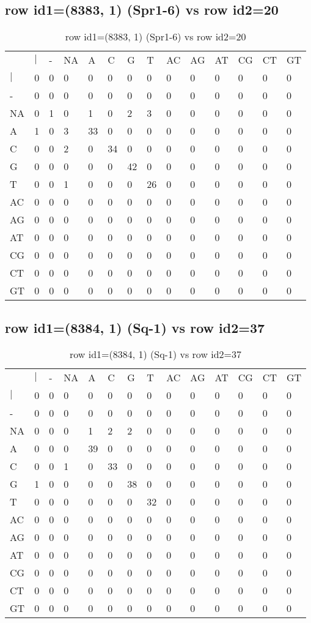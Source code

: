 \subsection{row id1=(8383, 1) (Spr1-6) vs row id2=20}
\begin{center}
\begin{longtable}{|l|l|l|l|l|l|l|l|l|l|l|l|l|l|}
\caption{row id1=(8383, 1) (Spr1-6) vs row id2=20} \label{table_dm622}\\
\hline
\\
\hline
&$|$&-&NA&A&C&G&T&AC&AG&AT&CG&CT&GT\\
$|$&0&0&0&0&0&0&0&0&0&0&0&0&0\\
-&0&0&0&0&0&0&0&0&0&0&0&0&0\\
NA&0&1&0&1&0&2&3&0&0&0&0&0&0\\
A&1&0&3&33&0&0&0&0&0&0&0&0&0\\
C&0&0&2&0&34&0&0&0&0&0&0&0&0\\
G&0&0&0&0&0&42&0&0&0&0&0&0&0\\
T&0&0&1&0&0&0&26&0&0&0&0&0&0\\
AC&0&0&0&0&0&0&0&0&0&0&0&0&0\\
AG&0&0&0&0&0&0&0&0&0&0&0&0&0\\
AT&0&0&0&0&0&0&0&0&0&0&0&0&0\\
CG&0&0&0&0&0&0&0&0&0&0&0&0&0\\
CT&0&0&0&0&0&0&0&0&0&0&0&0&0\\
GT&0&0&0&0&0&0&0&0&0&0&0&0&0\\
\hline
\end{longtable}
\end{center}

\subsection{row id1=(8384, 1) (Sq-1) vs row id2=37}
\begin{center}
\begin{longtable}{|l|l|l|l|l|l|l|l|l|l|l|l|l|l|}
\caption{row id1=(8384, 1) (Sq-1) vs row id2=37} \label{table_dm624}\\
\hline
\\
\hline
&$|$&-&NA&A&C&G&T&AC&AG&AT&CG&CT&GT\\
$|$&0&0&0&0&0&0&0&0&0&0&0&0&0\\
-&0&0&0&0&0&0&0&0&0&0&0&0&0\\
NA&0&0&0&1&2&2&0&0&0&0&0&0&0\\
A&0&0&0&39&0&0&0&0&0&0&0&0&0\\
C&0&0&1&0&33&0&0&0&0&0&0&0&0\\
G&1&0&0&0&0&38&0&0&0&0&0&0&0\\
T&0&0&0&0&0&0&32&0&0&0&0&0&0\\
AC&0&0&0&0&0&0&0&0&0&0&0&0&0\\
AG&0&0&0&0&0&0&0&0&0&0&0&0&0\\
AT&0&0&0&0&0&0&0&0&0&0&0&0&0\\
CG&0&0&0&0&0&0&0&0&0&0&0&0&0\\
CT&0&0&0&0&0&0&0&0&0&0&0&0&0\\
GT&0&0&0&0&0&0&0&0&0&0&0&0&0\\
\hline
\end{longtable}
\end{center}

